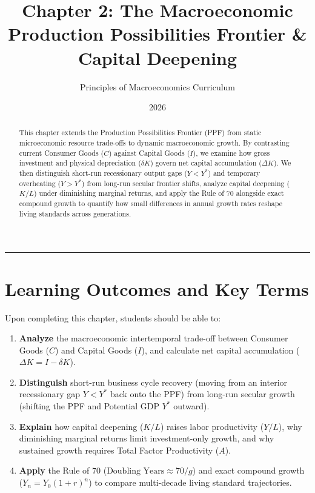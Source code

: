 \documentclass[11pt,letterpaper]{article}
\begin{document}
\title{\Huge\bfseries\color{SlateBlue} Chapter 2: The Macroeconomic Production Possibilities Frontier \& Capital Deepening}
\author{\large Principles of Macroeconomics Curriculum}
\date{2026}
\maketitle

\thispagestyle{plain}

\begin{abstract}
This chapter extends the Production Possibilities Frontier (PPF) from static microeconomic resource trade-offs to dynamic macroeconomic growth. By contrasting current Consumer Goods ($C$) against Capital Goods ($I$), we examine how gross investment and physical depreciation ($\delta K$) govern net capital accumulation ($\Delta K$). We then distinguish short-run recessionary output gaps ($Y < Y^*$) and temporary overheating ($Y > Y^*$) from long-run secular frontier shifts, analyze capital deepening ($K/L$) under diminishing marginal returns, and apply the Rule of 70 alongside exact compound growth to quantify how small differences in annual growth rates reshape living standards across generations.
\end{abstract}

\tableofcontents
\vspace{1.5em}
\hrule
\vspace{1.5em}

\section*{Learning Outcomes and Key Terms}

Upon completing this chapter, students should be able to:
\begin{enumerate}
  \item \textbf{Analyze} the macroeconomic intertemporal trade-off between Consumer Goods ($C$) and Capital Goods ($I$), and calculate net capital accumulation ($\Delta K = I - \delta K$).
  \item \textbf{Distinguish} short-run business cycle recovery (moving from an interior recessionary gap $Y < Y^*$ back onto the PPF) from long-run secular growth (shifting the PPF and Potential GDP $Y^*$ outward).
  \item \textbf{Explain} how capital deepening ($K/L$) raises labor productivity ($Y/L$), why diminishing marginal returns limit investment-only growth, and why sustained growth requires Total Factor Productivity ($A$).
  \item \textbf{Apply} the Rule of 70 ($\text{Doubling Years} \approx 70 / g$) and exact compound growth ($Y_n = Y_0(1+r)^n$) to compare multi-decade living standard trajectories.
\end{enumerate}
\end{document}
